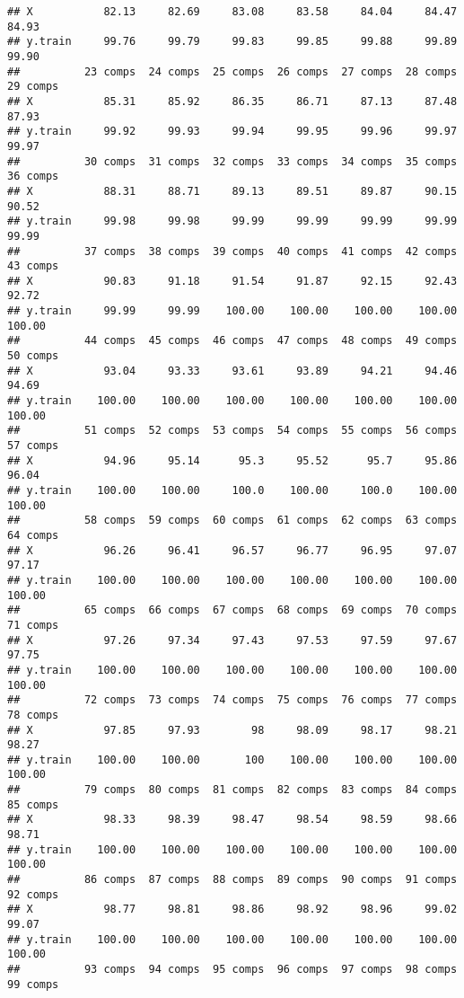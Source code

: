 \documentclass[
]{article}
\begin{document}
\begin{verbatim}
## X           82.13     82.69     83.08     83.58     84.04     84.47     84.93
## y.train     99.76     99.79     99.83     99.85     99.88     99.89     99.90
##          23 comps  24 comps  25 comps  26 comps  27 comps  28 comps  29 comps
## X           85.31     85.92     86.35     86.71     87.13     87.48     87.93
## y.train     99.92     99.93     99.94     99.95     99.96     99.97     99.97
##          30 comps  31 comps  32 comps  33 comps  34 comps  35 comps  36 comps
## X           88.31     88.71     89.13     89.51     89.87     90.15     90.52
## y.train     99.98     99.98     99.99     99.99     99.99     99.99     99.99
##          37 comps  38 comps  39 comps  40 comps  41 comps  42 comps  43 comps
## X           90.83     91.18     91.54     91.87     92.15     92.43     92.72
## y.train     99.99     99.99    100.00    100.00    100.00    100.00    100.00
##          44 comps  45 comps  46 comps  47 comps  48 comps  49 comps  50 comps
## X           93.04     93.33     93.61     93.89     94.21     94.46     94.69
## y.train    100.00    100.00    100.00    100.00    100.00    100.00    100.00
##          51 comps  52 comps  53 comps  54 comps  55 comps  56 comps  57 comps
## X           94.96     95.14      95.3     95.52      95.7     95.86     96.04
## y.train    100.00    100.00     100.0    100.00     100.0    100.00    100.00
##          58 comps  59 comps  60 comps  61 comps  62 comps  63 comps  64 comps
## X           96.26     96.41     96.57     96.77     96.95     97.07     97.17
## y.train    100.00    100.00    100.00    100.00    100.00    100.00    100.00
##          65 comps  66 comps  67 comps  68 comps  69 comps  70 comps  71 comps
## X           97.26     97.34     97.43     97.53     97.59     97.67     97.75
## y.train    100.00    100.00    100.00    100.00    100.00    100.00    100.00
##          72 comps  73 comps  74 comps  75 comps  76 comps  77 comps  78 comps
## X           97.85     97.93        98     98.09     98.17     98.21     98.27
## y.train    100.00    100.00       100    100.00    100.00    100.00    100.00
##          79 comps  80 comps  81 comps  82 comps  83 comps  84 comps  85 comps
## X           98.33     98.39     98.47     98.54     98.59     98.66     98.71
## y.train    100.00    100.00    100.00    100.00    100.00    100.00    100.00
##          86 comps  87 comps  88 comps  89 comps  90 comps  91 comps  92 comps
## X           98.77     98.81     98.86     98.92     98.96     99.02     99.07
## y.train    100.00    100.00    100.00    100.00    100.00    100.00    100.00
##          93 comps  94 comps  95 comps  96 comps  97 comps  98 comps  99 comps

\end{verbatim}
\end{document}
